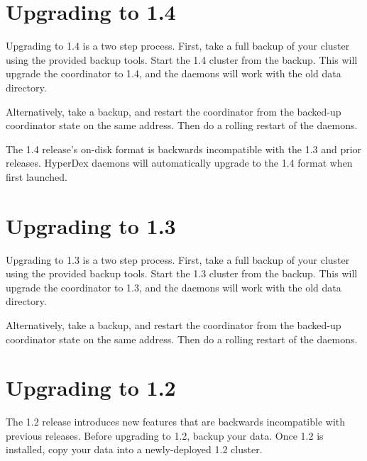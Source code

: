 \section{Upgrading to 1.4}
\label{sec:installation:upgrade1.4}

Upgrading to 1.4 is a two step process.  First, take a full backup of your
cluster using the provided backup tools.  Start the 1.4 cluster from the
backup.  This will upgrade the coordinator to 1.4, and the daemons will work
with the old data directory.

Alternatively, take a backup, and restart the coordinator from the backed-up
coordinator state on the same address.  Then do a rolling restart of the
daemons.

The 1.4 release's on-disk format is backwards incompatible with the 1.3 and
prior releases.  HyperDex daemons will automatically upgrade to the 1.4 format
when first launched.

\section{Upgrading to 1.3}
\label{sec:installation:upgrade1.3}

Upgrading to 1.3 is a two step process.  First, take a full backup of your
cluster using the provided backup tools.  Start the 1.3 cluster from the
backup.  This will upgrade the coordinator to 1.3, and the daemons will work
with the old data directory.

Alternatively, take a backup, and restart the coordinator from the backed-up
coordinator state on the same address.  Then do a rolling restart of the
daemons.

\section{Upgrading to 1.2}
\label{sec:installation:upgrade1.2}

The 1.2 release introduces new features that are backwards incompatible with
previous releases.  Before upgrading to 1.2, backup your data.  Once 1.2 is
installed, copy your data into a newly-deployed 1.2 cluster.
